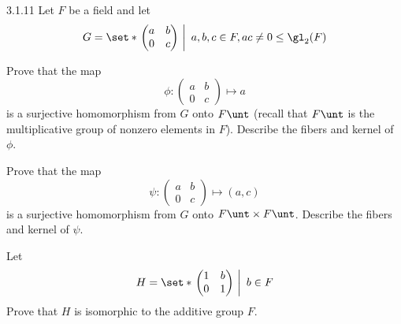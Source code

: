 \begin{exercise}{3.1.11}
    Let $F$ be a field and let
    \[
    	G = \set*{\left.
        \begin{pmatrix}
            a & b \\
            0 & c 
        \end{pmatrix}~\right|~a, b, c \in F, ac \neq 0} \leq \gl_2(F)
	\]
    \begin{subexercises}
        \item Prove that the map
        \[
        	\phi : 
            \begin{pmatrix}
                a & b \\
                0 & c
            \end{pmatrix} \mapsto a
	    \]
        is a surjective homomorphism from $G$ onto $F\unt$ (recall that $F\unt$ is the multiplicative group of nonzero elements in $F$).
	    Describe the fibers and kernel of $\phi$.
        \item Prove that the map
        \[
        	\psi : 
            \begin{pmatrix}
                a & b \\
                0 & c
            \end{pmatrix} \mapsto (a, c)
        \]
        is a surjective homomorphism from $G$ onto $F\unt \times F\unt$.
	    Describe the fibers and kernel of $\psi$. 
        \item Let
        \[
        	H = \set*{\left .
            \begin{pmatrix}
                1 & b \\
                0 & 1
            \end{pmatrix} ~\right\vert~b \in F}
        \]
        Prove that $H$ is isomorphic to the additive group $F$.
    \end{subexercises}
\end{exercise}


